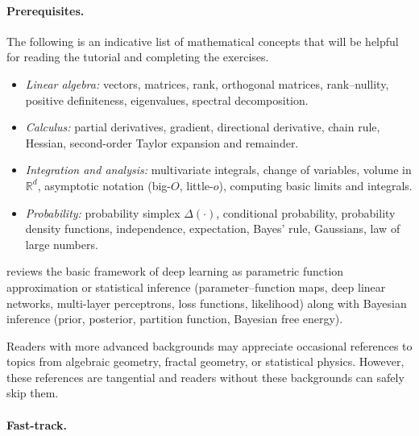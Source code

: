 \documentclass[11pt]{article}
\newcommand{\R}{\mathbb{R}}
\begin{document}
\paragraph{Prerequisites.}

The following is an indicative list of mathematical concepts that will be
helpful for reading the tutorial and completing the exercises.

\begin{itemize}
    \item
        \emph{Linear algebra:} vectors, matrices, rank, orthogonal matrices,
        rank--nullity, positive definiteness, eigenvalues, spectral decomposition.
    \item
        \emph{Calculus:} partial derivatives, gradient, directional derivative,
        chain rule, Hessian, second-order Taylor expansion and remainder.
    \item
        \emph{Integration and analysis:} multivariate integrals, change of
        variables, volume in $\R^d$, asymptotic notation (big-$O$, little-$o$),
        computing basic limits and integrals.
    \item
        \emph{Probability:} probability simplex $\Delta(\cdot)$, conditional
        probability, probability density functions, independence, expectation,
        Bayes' rule, Gaussians, law of large numbers.
\end{itemize}

 reviews the basic framework of deep learning as parametric
function approximation or statistical inference (parameter--function maps, deep
linear networks, multi-layer perceptrons, loss functions, likelihood) along
with Bayesian inference (prior, posterior, partition function, Bayesian free
energy).

Readers with more advanced backgrounds may appreciate occasional references to
topics from algebraic geometry, fractal geometry, or statistical physics.
However, these references are tangential and readers without these backgrounds
can safely skip them.

\paragraph{Fast-track.}
\end{document}
